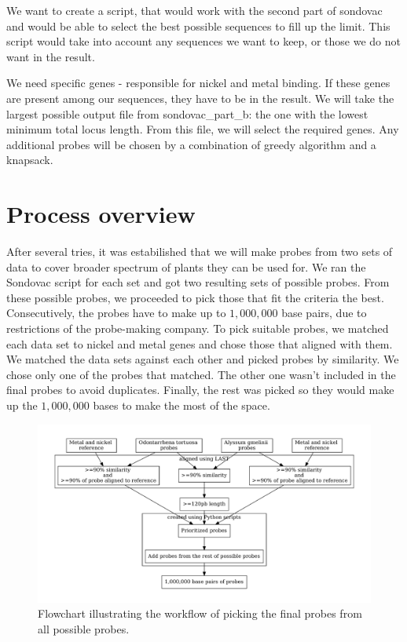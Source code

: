 We want to create a script, that would work with the second part of sondovac and would be able to select the best possible 
sequences to fill up the limit. This script would take into account any sequences we want to keep, or those we do not want in 
the result. 

We need specific genes - responsible for nickel and metal binding. If these genes are present among our sequences, they have 
to be in the result. We will take the largest possible output file from sondovac\_part\_b: the one with the lowest minimum total locus length. 
From this file, we will select the required genes. Any additional probes will be chosen by a combination of greedy algorithm and a knapsack. 


\section{Process overview}
After several tries, it was estabilished that we will make probes from two sets of data to cover broader spectrum of plants they can 
be used for. We ran the Sondovac script for each set and got two resulting sets of possible probes. From these possible probes, we 
proceeded to pick those that fit the criteria the best. Consecutively, the probes have to make up to $1,000,000$ base pairs, due to 
restrictions of the probe-making company. 
To pick suitable probes, we matched each data set to nickel and metal genes and chose those that aligned with them. We matched the 
data sets against each other and picked probes by similarity. We chose only one of the probes that matched. The other one 
wasn't included in the final probes to avoid duplicates. Finally, the rest was picked so they would make up the $1,000,000$ bases to 
make the most of the space. 


\begin{figure}
\centerline{
	\includegraphics[width=1\textwidth]{graphs/selecting_probes}
}
\caption[Workflow of picking the probes]{Flowchart illustrating the workflow of picking the final probes from all possible probes.}
\label{obr:picking_probes}
\end{figure}




